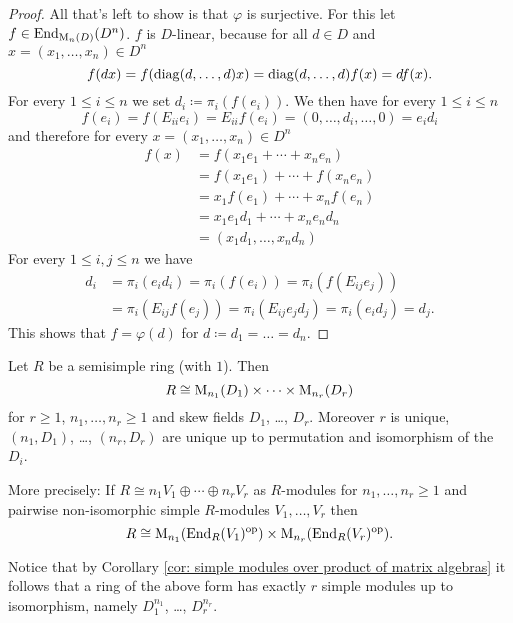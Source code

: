 \begin{proof}
  All that’s left to show is that $\varphi$ is surjective. For this let $f \in \operatorname{End}_{\operatorname{M}_n(D)}(D^n)$. $f$ is $D$-linear, because for all $d \in D$ and $x = (x_1, \dotsc, x_n) \in D^n$
  \[
    f(dx)
    = f( \operatorname{diag}(d, \dotsc, d) x)
    = \operatorname{diag}(d, \dotsc, d) f(x)
    = d f(x).
  \]
  For every $1 \leq i \leq n$ we set $d_i \coloneqq \pi_i(f(e_i))$. We then have for every $1 \leq i \leq n$
  \[
    f(e_i)
    = f(E_{ii} e_i)
    = E_{ii} f(e_i)
    = (0, \dotsc, d_i, \dotsc, 0)
    = e_i d_i 
  \]
  and therefore for every $x = (x_1, \dotsc, x_n) \in D^n$
  \begin{align*}
    f(x)
    &= f(x_1 e_1 + \dotsb + x_n e_n) \\
    &= f(x_1 e_1) + \dotsb + f(x_n e_n) \\
    &= x_1 f(e_1) + \dotsb + x_n f(e_n) \\
    &= x_1 e_1 d_1 + \dotsb + x_n e_n d_n \\
    &= (x_1 d_1, \dotsc, x_n d_n)
  \end{align*}
  For every $1 \leq i,j \leq n$ we have
  \begin{align*}
    d_i
    &= \pi_i(e_i d_i)
    = \pi_i(f(e_i))
    = \pi_i(f(E_{ij} e_j)) \\
    &= \pi_i(E_{ij} f(e_j))
    = \pi_i(E_{ij} e_j d_j)
    = \pi_i(e_i d_j)
    = d_j.
  \end{align*}   
  This shows that $f = \varphi(d)$ for $d \coloneqq d_1 = \dotsc = d_n$.
\end{proof}


\begin{thrm}
  Let $R$ be a semisimple ring (with $1$). Then
  \[
    R \cong \operatorname{M}_{n_1}(D_1) \times \dotsm \times \operatorname{M}_{n_r}(D_r)
  \]
  for $r \geq 1$, $n_1, \dotsc, n_r \geq 1$ and skew fields $D_1$, \dots, $D_r$. Moreover $r$ is unique, $(n_1,D_1)$, \dots, $(n_r,D_r)$ are unique up to permutation and isomorphism of the $D_i$.
  
  More precisely: If $R \cong n_1 V_1 \oplus \dotsb \oplus n_r V_r$ as $R$-modules for $n_1, \dotsc, n_r \geq 1$ and pairwise non-isomorphic simple $R$-modules $V_1, \dotsc, V_r$ then
  \[
    R \cong \operatorname{M}_{n_1}(\operatorname{End}_R(V_1)^{\mathrm{op}}) \times \operatorname{M}_{n_r}(\operatorname{End}_R(V_r)^{\mathrm{op}}).
  \]
\end{thrm}


Notice that by Corollary \ref{cor: simple modules over product of matrix algebras} it follows that a ring of the above form has exactly $r$ simple modules up to isomorphism, namely $D_1^{n_1}$, \dots, $D_r^{n_r}$.



